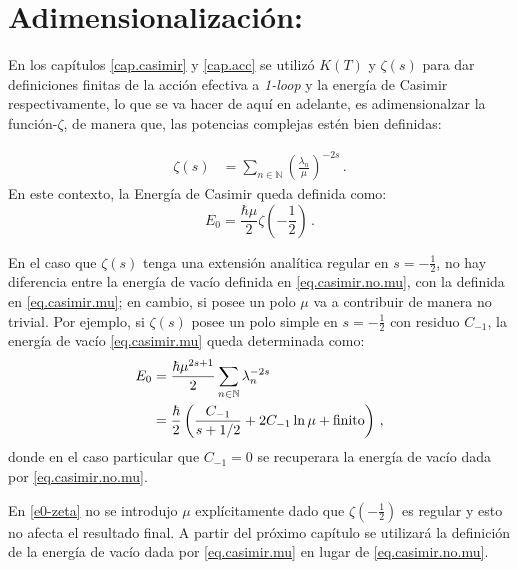 \bigskip

\section{Adimensionalización:}
\label{seq.adim}

\medskip

En los capítulos \ref{cap.casimir} y \ref{cap.acc} se utilizó $K(T)$ y $\zeta (s)$ para dar definiciones finitas de la acción efectiva a {\it 1-loop} y la energía de Casimir respectivamente, lo que se va hacer de aquí en adelante, es adimensionalzar la función-$\zeta$, de manera que, las potencias complejas estén bien definidas:

\begin{align}
\zeta  (s) &= \sum\limits_{n \in \mathbb N} \left( \frac{\lambda  _n}{\mu }  \right) ^{-2s } \label{def.adim} \, .
\end{align}
En este contexto, la Energía de Casimir queda definida como:
\begin{equation}
E _0 = \frac{\hbar \mu}{2} \zeta  \left( - \frac{1}{2} \right) \,.
\label{eq.casimir.mu}
\end{equation}

En el caso que $\zeta (s)$ tenga una extensión analítica regular en $s=-\frac{1}{2}$, no hay diferencia entre la energía de vacío definida en \eqref{eq.casimir.no.mu}, con la definida en \eqref{eq.casimir.mu}; en cambio, si posee un polo $\mu$ va a contribuir de manera no trivial. Por ejemplo, si $\zeta (s) $ posee un polo simple en $s= - \frac{1}{2}$ con residuo $C _{-1}$, la energía de vacío  \eqref{eq.casimir.mu} queda determinada como:
\begin{equation}
\begin{aligned}
E _0 &= 
\frac{\hbar \mu ^{2s+1}}{2} 
\sum\limits_{n \in \mathbb N}  \lambda _n   ^{-2s } \\ &= 
\frac{\hbar }{2} 
\left(
		\frac{C _{-1}}{  s+1/2 } + 2 C _{-1} \ln \mu + {\rm finito} 
		\right) 
\, ,
\end{aligned}
\end{equation}
donde en el caso particular que  $C _{-1} = 0 $ se recuperara la energía de vacío dada por \eqref{eq.casimir.no.mu}.


En \ref{e0-zeta} no se introdujo $\mu$ explícitamente dado que $\zeta \left(- \frac{1}{2} \right)$ es regular y esto no afecta el resultado final. A partir del próximo capítulo se utilizará la definición de la energía de vacío dada por \ref{eq.casimir.mu} en lugar de \ref{eq.casimir.no.mu}.